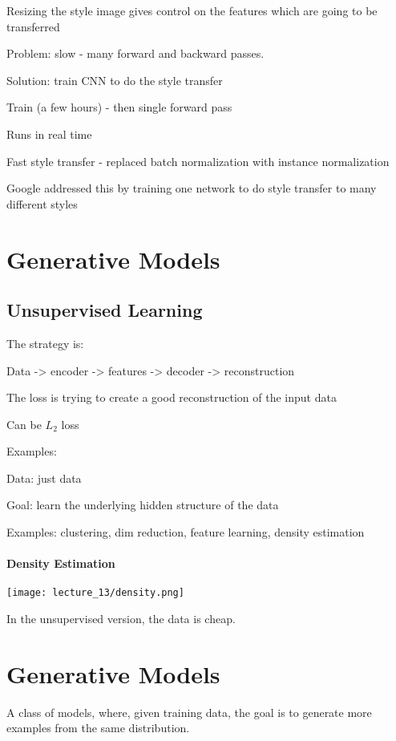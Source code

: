 Resizing the style image gives control on the features which are going to be transferred

Problem: slow - many forward and backward passes.

Solution: train CNN to do the style transfer

Train (a few hours) - then single forward pass

Runs in real time

Fast style transfer - replaced batch normalization with instance normalization 

Google addressed this by training one network to do style transfer to many different styles

\section{Generative Models}

\subsection{Unsupervised Learning}

The strategy is: 

Data -> encoder -> features -> decoder -> reconstruction

The loss is trying to create a good reconstruction of the input data

Can be $L_2$ loss

Examples: 

Data: just data

Goal: learn the underlying hidden structure of the data

Examples: clustering, dim reduction, feature learning, density estimation

\paragraph{Density Estimation}

\texttt{[image: lecture\_13/density.png]}

In the unsupervised version, the data is cheap.



\section{Generative Models}

A class of models, where, given training data, the goal is to generate more examples from the same distribution.

